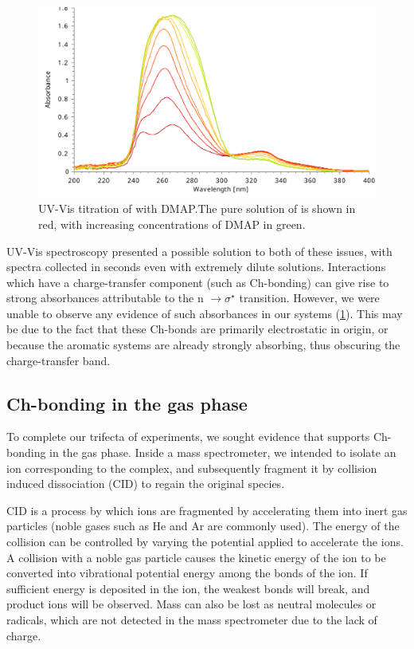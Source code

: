 \begin{refsection}
\begin{figure}
  \includegraphics[width=0.7\linewidth]{Figures/ebs-dmap-uv-titration.pdf}
  \caption[UV-Vis titration of  with DMAP.]{UV-Vis titration of  with DMAP.\@ The pure solution of  is shown in red, with increasing concentrations of DMAP in green.}\label{fig:ebs-dmap-uv-titration}
\end{figure}

UV-Vis spectroscopy presented a possible solution to both of these issues, with spectra collected in seconds even with extremely dilute solutions.
Interactions which have a charge-transfer component (such as Ch-bonding) can give rise to strong absorbances attributable to the n $\rightarrow \sigma^{\star}$ transition.\autocite{Blackstock1987}
However, we were unable to observe any evidence of such absorbances in our systems (\cref{fig:ebs-dmap-uv-titration}).
This may be due to the fact that these Ch-bonds are primarily electrostatic in origin, or because the aromatic systems are already strongly absorbing, thus obscuring the charge-transfer band.

\subsection{Ch-bonding in the gas phase}
To complete our trifecta of experiments, we sought evidence that supports Ch-bonding in the gas phase.
Inside a mass spectrometer, we intended to isolate an ion corresponding to the complex, and subsequently fragment it by collision induced dissociation (CID) to regain the original species.

CID is a process by which ions are fragmented by accelerating them into inert gas particles (noble gases such as He and Ar are commonly used).
The energy of the collision can be controlled by varying the potential applied to accelerate the ions.
A collision with a noble gas particle causes the kinetic energy of the ion to be converted into vibrational potential energy among the bonds of the ion.
If sufficient energy is deposited in the ion, the weakest bonds will break, and product ions will be observed.
Mass can also be lost as neutral molecules or radicals, which are not detected in the mass spectrometer due to the lack of charge.


\end{refsection}
